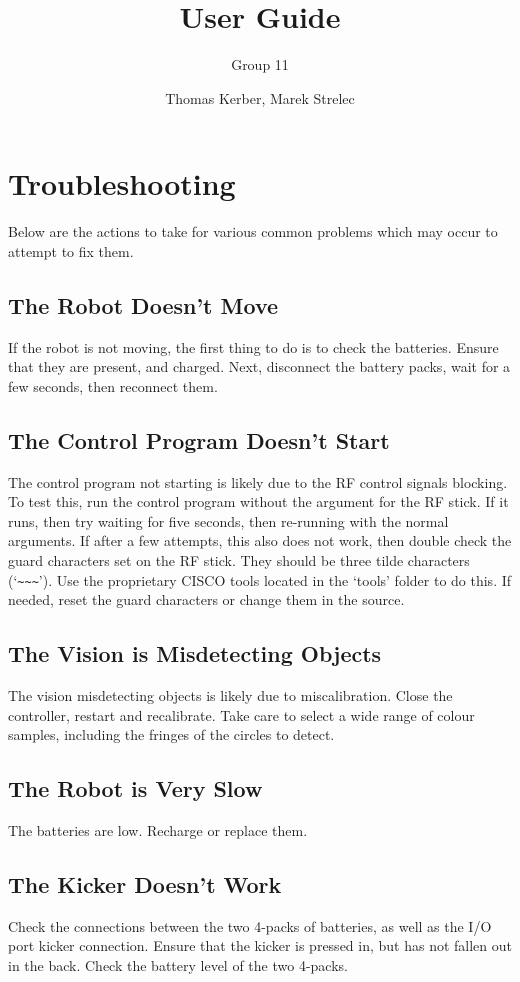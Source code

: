 \documentclass[a4paper,12pt]{scrartcl}
\author{Thomas Kerber, Marek Strelec}
\title{User Guide}
\subtitle{Group 11}
\begin{document}
\maketitle




\section{Troubleshooting}

Below are the actions to take for various common problems which may occur to
attempt to fix them.

\subsection{The Robot Doesn't Move}

If the robot is not moving, the first thing to do is to check the batteries.
Ensure that they are present, and charged. Next, disconnect the battery packs,
wait for a few seconds, then reconnect them.

\subsection{The Control Program Doesn't Start}

The control program not starting is likely due to the RF control signals
blocking. To test this, run the control program without the argument for the RF
stick. If it runs, then try waiting for five seconds, then re-running with the
normal arguments. If after a few attempts, this also does not work, then double
check the guard characters set on the RF stick. They should be three tilde
characters (`\verb$~~~$'). Use the proprietary CISCO tools located in the
`tools' folder to do this. If needed, reset the guard characters or change them
in the source.

\subsection{The Vision is Misdetecting Objects}

The vision misdetecting objects is likely due to miscalibration. Close the
controller, restart and recalibrate. Take care to select a wide range of colour
samples, including the fringes of the circles to detect.

\subsection{The Robot is Very Slow}

The batteries are low. Recharge or replace them.

\subsection{The Kicker Doesn't Work}

Check the connections between the two 4-packs of batteries, as well as the I/O
port kicker connection. Ensure that the kicker is pressed in, but has not
fallen out in the back. Check the battery level of the two 4-packs.
\end{document}
